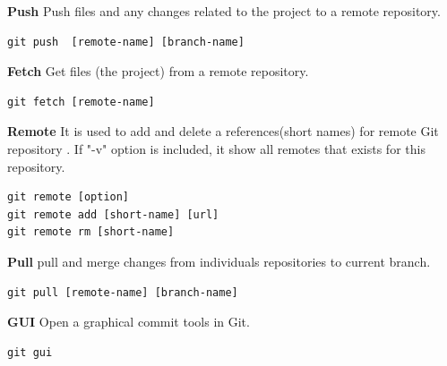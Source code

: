 \documentclass[11pt]{report}
\begin{document}
\textbf{Push} Push files and any changes related to the project  to a remote repository.
\begin{verbatim}
git push  [remote-name] [branch-name]
\end{verbatim}

\textbf{Fetch} Get files (the project) from a remote repository.
\begin{verbatim}
git fetch [remote-name]
\end{verbatim}

\textbf{Remote} It is used to add and delete a  references(short names) for remote Git repository . If "-v" option is included, it show all remotes that exists for this repository.
\begin{verbatim}
git remote [option]
git remote add [short-name] [url]
git remote rm [short-name]
\end{verbatim}

\textbf{Pull} pull and merge changes from individuals repositories to current branch.
\begin{verbatim}
git pull [remote-name] [branch-name]
\end{verbatim}

\textbf{GUI} Open a graphical commit tools in Git.
\begin{verbatim}
git gui
\end{verbatim}
\end{document}
